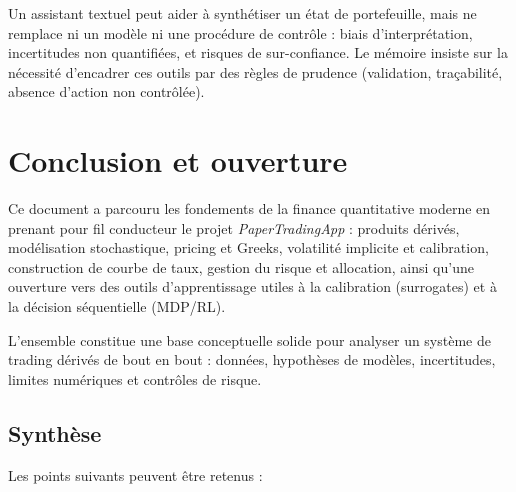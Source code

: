 \documentclass[11pt,a4paper]{article}
\newcommand{\1}{\mathbf{1}}
\begin{document}
Un assistant textuel peut aider \`a synth\'etiser un \'etat de portefeuille, mais ne remplace ni un mod\`ele ni une
proc\'edure de contr\^ole : biais d'interpr\'etation, incertitudes non quantifi\'ees, et risques de sur-confiance. Le
m\'emoire insiste sur la n\'ecessit\'e d'encadrer ces outils par des r\`egles de prudence (validation, tra\c{c}abilit\'e,
absence d'action non contr\^ol\'ee).

\section{Conclusion et ouverture}

Ce document a parcouru les fondements de la finance quantitative moderne en prenant pour fil conducteur le projet
\emph{PaperTradingApp} : produits d\'eriv\'es, mod\'elisation stochastique, pricing et Greeks, volatilit\'e implicite et
calibration, construction de courbe de taux, gestion du risque et allocation, ainsi qu'une ouverture vers des outils
d'apprentissage utiles \`a la calibration (surrogates) et \`a la d\'ecision s\'equentielle (MDP/RL).

L'ensemble constitue une base conceptuelle solide pour analyser un syst\`eme de trading d\'eriv\'es de bout en bout :
donn\'ees, hypoth\`eses de mod\`eles, incertitudes, limites num\'eriques et contr\^oles de risque.

\subsection{Synthèse}

Les points suivants peuvent \^etre retenus :
\end{document}
